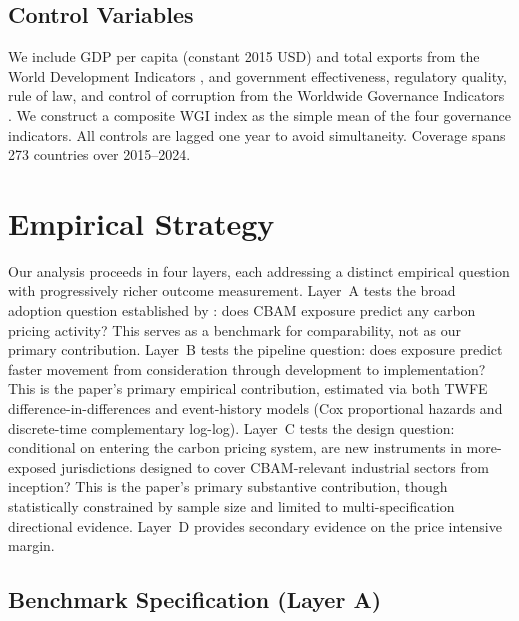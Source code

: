 \documentclass[12pt,a4paper]{article}
\begin{document}
\subsection{Control Variables}\label{sec:controls}

We include GDP per capita (constant 2015 USD) and total exports from the World Development Indicators \citep{WDI2025}, and government effectiveness, regulatory quality, rule of law, and control of corruption from the Worldwide Governance Indicators \citep{WGI2025}. We construct a composite WGI index as the simple mean of the four governance indicators. All controls are lagged one year to avoid simultaneity. Coverage spans 273 countries over 2015--2024.


\section{Empirical Strategy}\label{sec:strategy}

Our analysis proceeds in four layers, each addressing a distinct empirical question with progressively richer outcome measurement. Layer~A tests the broad adoption question established by \citet{Bahi2026}: does CBAM exposure predict any carbon pricing activity? This serves as a benchmark for comparability, not as our primary contribution. Layer~B tests the pipeline question: does exposure predict faster movement from consideration through development to implementation? This is the paper's primary empirical contribution, estimated via both TWFE difference-in-differences and event-history models (Cox proportional hazards and discrete-time complementary log-log). Layer~C tests the design question: conditional on entering the carbon pricing system, are new instruments in more-exposed jurisdictions designed to cover CBAM-relevant industrial sectors from inception? This is the paper's primary substantive contribution, though statistically constrained by sample size and limited to multi-specification directional evidence. Layer~D provides secondary evidence on the price intensive margin.

\subsection{Benchmark Specification (Layer A)}\label{sec:benchmark_spec}
\end{document}
